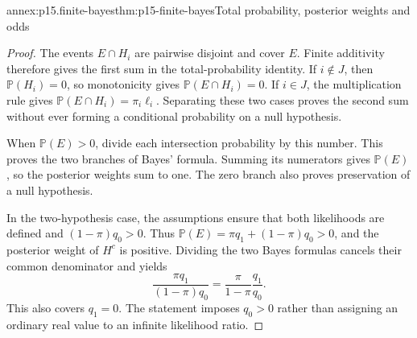 \begin{annexitem}{annex:p15.finite-bayes}{thm:p15-finite-bayes}{Total probability, posterior weights and odds}
\begin{proof}
The events \(E\cap H_i\) are pairwise disjoint and cover \(E\).
Finite additivity therefore gives the first sum in the total-probability
identity. If \(i\notin J\), then \(\mathbb P(H_i)=0\), so
monotonicity gives \(\mathbb P(E\cap H_i)=0\). If \(i\in J\),
the multiplication rule gives
\(\mathbb P(E\cap H_i)=\pi_i\ell_i\). Separating these two cases
proves the second sum without ever forming a conditional probability on
a null hypothesis.

When \(\mathbb P(E)>0\), divide each intersection probability by this
number. This proves the two branches of Bayes' formula. Summing its
numerators gives \(\mathbb P(E)\), so the posterior weights sum to
one. The zero branch also proves preservation of a null hypothesis.

In the two-hypothesis case, the assumptions ensure that both likelihoods
are defined and \((1-\pi)q_0>0\). Thus
\(\mathbb P(E)=\pi q_1+(1-\pi)q_0>0\), and the posterior weight of
\(H^c\) is positive. Dividing the two Bayes formulas cancels their
common denominator and yields
\[
 \frac{\pi q_1}{(1-\pi)q_0}
 =\frac{\pi}{1-\pi}\frac{q_1}{q_0}.
\]
This also covers \(q_1=0\). The statement imposes \(q_0>0\) rather
than assigning an ordinary real value to an infinite likelihood ratio.
\end{proof}
\end{annexitem}

